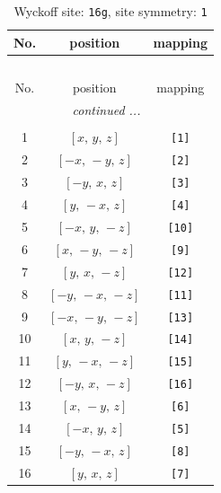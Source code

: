 \documentclass[fleqn,8pt]{jsarticle}
\begin{document}
\renewcommand{\arraystretch}{1.2}
\begin{longtable}{ccc}
\caption{Wyckoff site: {\tt 16g}, site symmetry: {\tt 1}}
 \\
 \hline \hline
No. & position & mapping \\ \hline \endfirsthead

\multicolumn{2}{l}{\tablename\ \thetable{}} \\
 \hline \hline
No. & position & mapping \\ \hline \endhead

 \hline \hline
\multicolumn{2}{r}{\footnotesize\it continued ...} \\ \endfoot

 \hline \hline
\multicolumn{2}{r}{} \\ \endlastfoot

1 & $\left[ x,\, y,\, z \right]$ & {\tt [1]} \\ \hline
2 & $\left[ - x,\, - y,\, z \right]$ & {\tt [2]} \\ \hline
3 & $\left[ - y,\, x,\, z \right]$ & {\tt [3]} \\ \hline
4 & $\left[ y,\, - x,\, z \right]$ & {\tt [4]} \\ \hline
5 & $\left[ - x,\, y,\, - z \right]$ & {\tt [10]} \\ \hline
6 & $\left[ x,\, - y,\, - z \right]$ & {\tt [9]} \\ \hline
7 & $\left[ y,\, x,\, - z \right]$ & {\tt [12]} \\ \hline
8 & $\left[ - y,\, - x,\, - z \right]$ & {\tt [11]} \\ \hline
9 & $\left[ - x,\, - y,\, - z \right]$ & {\tt [13]} \\ \hline
10 & $\left[ x,\, y,\, - z \right]$ & {\tt [14]} \\ \hline
11 & $\left[ y,\, - x,\, - z \right]$ & {\tt [15]} \\ \hline
12 & $\left[ - y,\, x,\, - z \right]$ & {\tt [16]} \\ \hline
13 & $\left[ x,\, - y,\, z \right]$ & {\tt [6]} \\ \hline
14 & $\left[ - x,\, y,\, z \right]$ & {\tt [5]} \\ \hline
15 & $\left[ - y,\, - x,\, z \right]$ & {\tt [8]} \\ \hline
16 & $\left[ y,\, x,\, z \right]$ & {\tt [7]} \\
\end{longtable}
\end{document}

